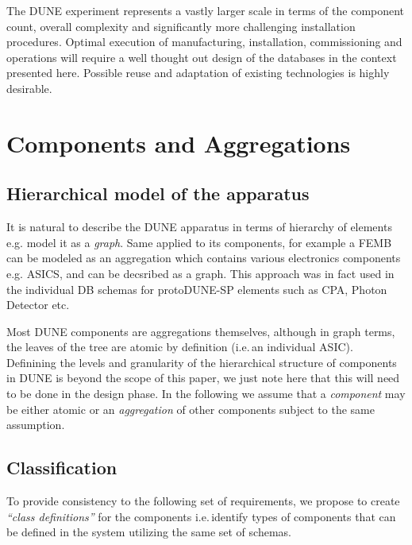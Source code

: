 \documentclass[pdftex,12pt,letter]{article}
\begin{document}
The DUNE experiment represents a vastly larger scale in terms of the component count,
overall complexity and significantly more challenging installation procedures. Optimal execution
of manufacturing, installation, commissioning and operations will require a well thought out design
of the databases in the context presented here. Possible reuse and adaptation of existing technologies
is highly desirable.


\section{Components and Aggregations}
\subsection{Hierarchical model of the apparatus}

It is natural to describe the DUNE apparatus in terms of hierarchy of elements e.g. model it
as a \textit{graph}. Same applied to its components, for example a FEMB can be modeled as an
aggregation which contains various electronics components e.g. ASICS, and can be decsribed as a graph.
This approach was in fact used in the individual DB schemas for protoDUNE-SP elements such as CPA, Photon Detector etc.

Most DUNE components are aggregations themselves, although in graph terms, the leaves of the tree are atomic
by definition (i.e.\,an individual ASIC).  Definining the levels and granularity of the hierarchical structure of components
in DUNE is beyond the scope of this paper, we just note here that this will need to be done in the design phase.
In the following we assume that a \textit{component} may be either atomic or an \textit{aggregation} of other components
subject to the same assumption.

\subsection{Classification}
\label{classification}
To provide consistency to the following set of requirements, we propose to create \textit{``class definitions''} for the components
i.e.\,identify types of components that can be defined in the system utilizing the same set of schemas.
\end{document}
